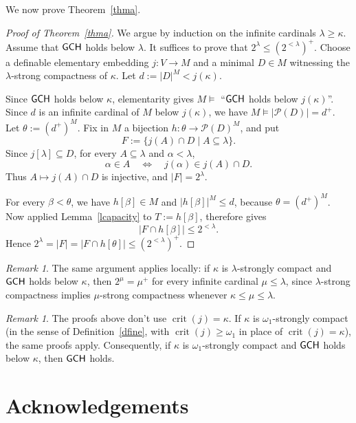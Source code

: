 \documentclass[10pt,a4paper]{amsart}
\theoremstyle{definition}
\theoremstyle{remark}
\newtheorem{remark}[thm]{Remark}
\renewcommand{\mid}{\mathrel{|}\allowbreak}
\DeclareMathOperator{\crit}{crit}
\newcommand*\axiomfont[1]{\textsf{\textup{#1}}}
\newcommand\gch{\axiomfont{GCH}}
\begin{document}
We now prove Theorem~\ref{thma}.


\begin{proof}[Proof of Theorem~\ref{thma}]
    We argue by induction on the infinite cardinals $\lambda \geq \kappa$.
    Assume that $\gch$ holds below $\lambda$.
    It suffices to prove that $2^\lambda\le (2^{<\lambda})^+$.
    Choose a definable elementary embedding $j:V\rightarrow M$ and a minimal $D\in M$ witnessing the $\lambda$-strong compactness of $\kappa$.
    Let $d:=|D|^M<j(\kappa)$.

    Since $\gch$ holds below $\kappa$, elementarity gives
    $M\models$ ``$\gch$ holds below $j(\kappa)$''.
    Since $d$ is an infinite cardinal of $M$ below $j(\kappa)$,
    we have $M\models|\mathcal P(D)|=d^+$.
    Let $\theta:=(d^+)^M$.
    Fix in $M$ a bijection $h:\theta\rightarrow\mathcal P(D)^M$, and put
    $$F:=\{j(A)\cap D\mid A\subseteq\lambda\}.$$
    Since $j[\lambda]\subseteq D$, for every $A\subseteq\lambda$ and $\alpha<\lambda$,
    $$\alpha\in A\quad\Longleftrightarrow\quad j(\alpha)\in j(A)\cap D.$$
    Thus $A\mapsto j(A)\cap D$ is injective, and $|F|=2^\lambda$.

    For every $\beta<\theta$, we have $h[\beta]\in M$ and $|h[\beta]|^M\le d$, because $\theta=(d^+)^M$.
    Now applied Lemma~\ref{lcapacity} to $T:=h[\beta]$, therefore gives
    $$|F\cap h[\beta]|\le 2^{<\lambda}.$$
    Hence $2^\lambda=|F|=|F\cap h[\theta]|\le (2^{<\lambda})^+$.
\end{proof}


\begin{remark}
    The same argument applies locally:
    if $\kappa$ is $\lambda$-strongly compact and $\gch$ holds below $\kappa$,
    then $2^\mu=\mu^+$ for every infinite cardinal $\mu\le\lambda$,
    since $\lambda$-strong compactness implies $\mu$-strong compactness whenever $\kappa\le\mu\le\lambda$.
\end{remark}

\begin{remark}
    The proofs above don't use $\crit(j)=\kappa$.
    If $\kappa$ is $\omega_1$-strongly compact (in the sense of Definition~\ref{dfine}, with
    $\crit(j)\ge\omega_1$ in place of $\crit(j)=\kappa$), the same proofs apply.
    Consequently, if $\kappa$ is $\omega_1$-strongly compact and $\gch$ holds below $\kappa$, then $\gch$ holds.
\end{remark}

\section*{Acknowledgements}
\end{document}

